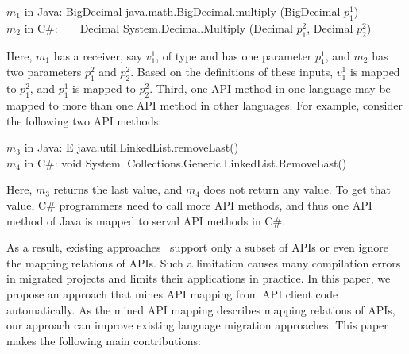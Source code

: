 \begin{CodeOut}
$m_1$ in Java: BigDecimal java.math.BigDecimal.multiply (BigDecimal $p_1^1$)\\
\hspace*{0.11in}$m_2$ in C\#:\ \ \ \  Decimal
System.Decimal.Multiply (Decimal $p_1^2$, Decimal $p_2^2$)
\end{CodeOut}

Here, $m_1$ has a receiver, say $v_1^1$, of type 
and has one parameter $p_1^1$, and $m_2$ has two parameters $p_1^2$
and $p_2^2$. Based on the definitions of these inputs, $v_1^1$ is
mapped to $p_1^2$, and $p_1^1$ is mapped to $p_2^2$. Third, one API
method in one language may be mapped to more than one API method in
other languages. For example, consider the following two API
methods:

\begin{CodeOut}
$m_3$ in Java: E java.util.LinkedList.removeLast()\\
\hspace*{0.11in}$m_4$ in C\#: void System.
Collections.Generic.LinkedList.RemoveLast()
\end{CodeOut}

Here, $m_3$ returns the last value, and $m_4$ does not return any
value. To get that value, C\# programmers need to call more API
methods, and thus one API method of Java is mapped to serval API
methods in C\#.


As a result, existing
approaches~\cite{mossienko2003automated,yasumatsu1995spice,hainaut2008migration}
support only a subset of APIs or even ignore the mapping relations
of APIs. Such a limitation causes many compilation errors in
migrated projects and limits their applications in practice. In this
paper, we propose an approach that mines API mapping from API client
code automatically. As the mined API mapping describes mapping
relations of APIs, our approach can improve existing language
migration approaches. This paper makes the following main
contributions:

